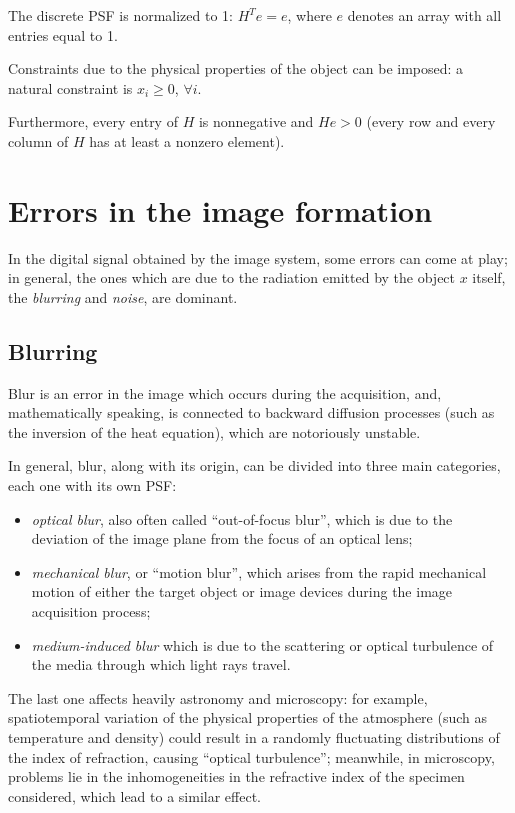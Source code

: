 The discrete PSF is  normalized to 1: $H^T e= e$, where $e$ denotes an array with all entries equal to 1.

Constraints due to the physical properties of the object can be imposed: a natural constraint is $x_i \geq 0$, $\forall i$.

Furthermore, every entry of $H$ is nonnegative and $He > 0$ (every row and every column of $H$ has at least a nonzero element).

\section{Errors in the image formation}

In the digital signal obtained by the image system, some errors can come at play; in general, the ones which are due to the radiation emitted by the object $x$ itself, the \emph{blurring} and \emph{noise}, are dominant.

\subsection{Blurring} \label{sec:blurring}

Blur is an error in the image which occurs during the acquisition, and, mathematically speaking, is connected to backward diffusion processes (such as the inversion of the heat equation), which are notoriously unstable.

In general, blur, along with its origin, can be divided into three main categories, each one with its own PSF:

\begin{itemize}
\item \emph{optical blur}, also often called ``out-of-focus blur'', which is due to the deviation of the image plane from the focus of an optical lens;
\item \emph{mechanical blur}, or ``motion blur'', which arises from the rapid mechanical motion of either the target object or image devices during the image acquisition process;
\item \emph{medium-induced blur} which is due to the scattering or optical turbulence of the media through which light rays travel.
\end{itemize}

The last one affects heavily astronomy and microscopy: for example, spatiotemporal variation of the physical properties of the atmosphere (such as temperature and density) could result in a randomly fluctuating distributions of the index of refraction, causing ``optical turbulence''; meanwhile, in microscopy, problems lie in the inhomogeneities in the refractive index of the specimen considered, which lead to a similar effect.

